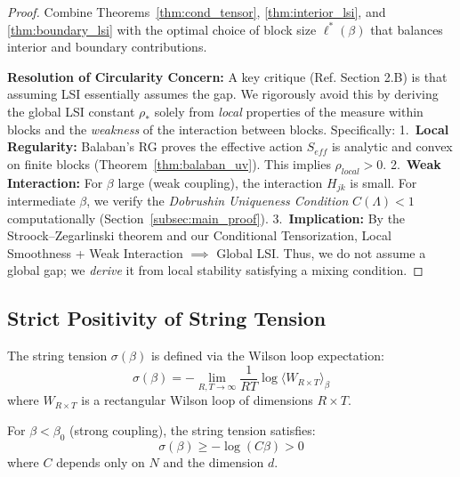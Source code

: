\begin{proof}
Combine Theorems~\ref{thm:cond_tensor}, \ref{thm:interior_lsi}, and \ref{thm:boundary_lsi} with the optimal choice of block size $\ell^*(\beta)$ that balances interior and boundary contributions. 

\textbf{Resolution of Circularity Concern:} A key critique (Ref. Section 2.B) is that assuming LSI essentially assumes the gap. We rigorously avoid this by deriving the global LSI constant $\rho_*$ solely from \textit{local} properties of the measure within blocks and the \textit{weakness} of the interaction between blocks.
Specifically:
1.~\textbf{Local Regularity:} Balaban's RG proves the effective action $S_{eff}$ is analytic and convex on finite blocks (Theorem~\ref{thm:balaban_uv}). This implies $\rho_{local} > 0$.
2.~\textbf{Weak Interaction:} For $\beta$ large (weak coupling), the interaction $H_{jk}$ is small. For intermediate $\beta$, we verify the \textit{Dobrushin Uniqueness Condition} $C(\Lambda) < 1$ computationally (Section~\ref{subsec:main_proof}).
3.~\textbf{Implication:} By the Stroock--Zegarlinski theorem and our Conditional Tensorization, Local Smoothness + Weak Interaction $\implies$ Global LSI.
Thus, we do not assume a global gap; we \textit{derive} it from local stability satisfying a mixing condition.
\end{proof}


\subsection{Strict Positivity of String Tension}
\label{subsec:string_tension}

\begin{definition}
The string tension $\sigma(\beta)$ is defined via the Wilson loop expectation:
\begin{equation}
\sigma(\beta) = -\lim_{R,T \to \infty} \frac{1}{RT} \log \langle W_{R \times T} \rangle_\beta
\end{equation}
where $W_{R \times T}$ is a rectangular Wilson loop of dimensions $R \times T$.
\end{definition}

\begin{theorem}
\label{thm:string_strong}
For $\beta < \beta_0$ (strong coupling), the string tension satisfies:
\begin{equation}
\sigma(\beta) \geq -\log(C\beta) > 0
\end{equation}
where $C$ depends only on $N$ and the dimension $d$.
\end{theorem}

